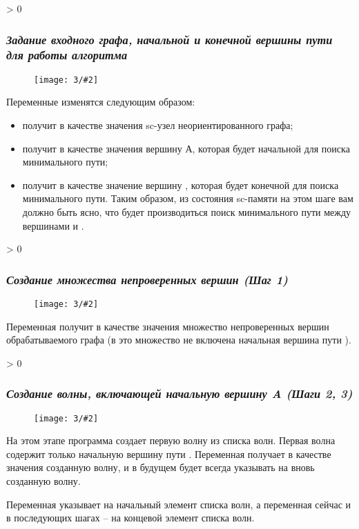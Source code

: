 
\newenvironment{algostep}[3]
{
  \ifnum \value{algosteps} > 0
  \newpage
  \fi
  \addtocounter{algosteps}{1}

  \subsubsection*{\emph{#1}}
  \label{astep:#2}
  
  \begin{figure}[h!]
    \centering
    \texttt{[image: 3/\#2]}
  \end{figure}
}
{
}

\begin{algostep}{Задание входного графа, начальной и конечной вершины
    пути для работы алгоритма}{S1_Input_graph}{0.8}
  
  Переменные изменятся следующим образом:

  \begin{itemize}
  \item {} получит в качестве значения sc-узел
    неориентированного графа;
  \item {} получит в качестве
    значения вершину А, которая будет начальной для поиска минимального
    пути;
  \item {} получит в качестве значение вершину ,
    которая будет конечной для поиска минимального пути.  Таким образом,
    из состояния sc-памяти на этом шаге вам должно быть ясно, что будет
    производиться поиск минимального пути между вершинами  и .
  \end{itemize}
\end{algostep}


\begin{algostep}{Создание множества непроверенных вершин (Шаг
    1)}{S2_Create_unchecked_vertexes_set}{0.8}

  Переменная  получит в качестве значения
  множество непроверенных вершин обрабатываемого графа (в это множество
  не включена начальная вершина пути ).
\end{algostep}


\begin{algostep}{Создание волны, включающей начальную вершину A (Шаги
    2, 3)}{S3_Create_1st_wave}{0.8}

  На этом этапе программа создает первую волну из списка волн. Первая
  волна содержит только начальную вершину пути . Переменная
   получает в качестве значения созданную волну, и в
  будущем будет всегда указывать на вновь созданную волну.

  Переменная  указывает на начальный элемент
  списка волн, а переменная  сейчас и в
  последующих шагах – на концевой элемент списка волн.
\end{algostep}


